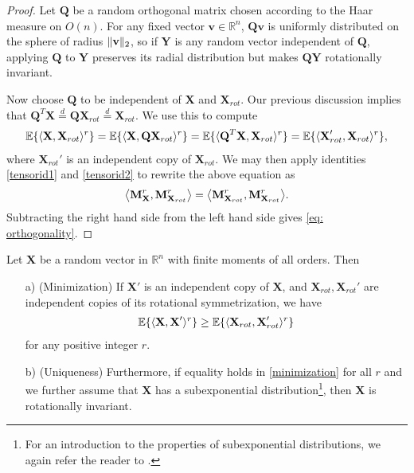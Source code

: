 \documentclass[final,12pt]{colt2018} %
\numberwithin{equation}{section}
\DeclarePairedDelimiter{\norm}{\lVert}{\rVert}
\DeclarePairedDelimiter{\braces}{\lbrace}{\rbrace}
\DeclarePairedDelimiter{\inprod}{\langle}{\rangle}
\newcommand{\E}{\mathbb{E}}
\newcommand{\R}{\mathbb{R}}
\newcommand{\boldv}{\textbf{v}}
\newcommand{\boldQ}{\textbf{Q}}
\newcommand{\boldX}{\textbf{X}}
\newcommand{\boldY}{\textbf{Y}}
\newcommand{\boldM}{\textbf{M}}
\begin{document}
\begin{proof}
	Let $\boldQ$ be a random orthogonal matrix chosen according to the Haar measure on $O(n)$. For any fixed vector $\boldv \in \R^n$, $\boldQ\boldv$ is uniformly distributed on the sphere of radius $\norm{\boldv}_2$, so if $\boldY$ is any random vector independent of $\boldQ$, applying $\boldQ$ to $\boldY$ preserves its radial distribution but makes $\boldQ\boldY$ rotationally invariant.
	
	Now choose $\boldQ$ to be independent of $\boldX$ and $\boldX_{rot}$. Our previous discussion implies that $\boldQ^T\boldX \stackrel{d}{=} \boldQ\boldX_{rot} \stackrel{d}{=} \boldX_{rot}$.
	We use this to compute
	\begin{align}
	\E\braces{\inprod{\boldX,\boldX_{rot}}^r} = \E\braces{\inprod{\boldX,\boldQ\boldX_{rot}}^r} = \E\braces{\inprod{\boldQ^T \boldX,\boldX_{rot}}^r} = \E\braces{\inprod{\boldX_{rot}',\boldX_{rot}}^r},
	\end{align}
	where $\boldX_{rot}'$ is an independent copy of $\boldX_{rot}$. We may then apply identities \eqref{tensorid1} and \eqref{tensorid2} to rewrite the above equation as
	\begin{align}
	\inprod*{\boldM^r_\boldX,\boldM^r_{\boldX_{rot}}} = \inprod*{\boldM^r_{\boldX_{rot}},\boldM^r_{\boldX_{rot}}}.
	\end{align}
	Subtracting the right hand side from the left hand side gives \eqref{eq: orthogonality}.
\end{proof}

\begin{theorem}\label{thm: inner product moments minimized by rotational symmetrization}
	Let $\boldX$ be a random vector in $\R^n$ with finite moments of all orders. Then
	\begin{enumerate}[nosep]
		\item[a)] (Minimization) If $\boldX'$ is an independent copy of $\boldX$, and $\boldX_{rot}, \boldX_{rot}'$ are independent copies of its rotational symmetrization, we have
		\begin{align} \label{minimization}
		\E\braces{\inprod{\boldX,\boldX'}^r} \geq \E\braces{\inprod{\boldX_{rot},\boldX_{rot}'}^r}
		\end{align}
		for any positive integer $r$.
		\item[b)] (Uniqueness) Furthermore, if equality holds in \eqref{minimization} for all $r$ and we further assume that $\boldX$ has a subexponential distribution\footnote{For an introduction to the properties of subexponential distributions, we again refer the reader to \cite{Vershynin2011b}.}, then $\boldX$ is rotationally invariant.
	\end{enumerate}
\end{theorem}
\end{document}
